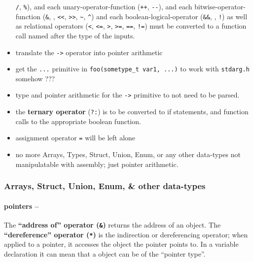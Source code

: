 \begin{itemize}
  \texttt{/}, \texttt{\%}), and each unary-operator-function
  (\texttt{++}, \texttt{-\/-}), and each bitwise-operator-function
  (\texttt{\&}, \texttt{\textbar{}}, \texttt{\textless{}\textless{}},
  \texttt{\textgreater{}\textgreater{}}, \texttt{\textasciitilde{}},
  \texttt{\^{}}) and each boolean-logical-operator (\texttt{\&\&},
  \texttt{\textbar{}\textbar{}}, \texttt{!}) as well as relational
  operators (\texttt{\textless{}}, \texttt{\textless{}=},
  \texttt{\textgreater{}}, \texttt{\textgreater{}=}, \texttt{==},
  \texttt{!=}) must be converted to a function call named after the type
  of the inputs.
\item
  translate the \texttt{-\textgreater{}} operator into pointer
  arithmetic
\item
  get the \texttt{...} primitive in
  \texttt{foo(sometype\_t\ var1,\ ...)} to work with \texttt{stdarg.h}
  somehow ???
\item
  type and pointer arithmetic for the \texttt{-\textgreater{}} primitive
  to not need to be parsed.
\item
  the \textbf{ternary operator} (\texttt{?:}) is to be converted to if
  statements, and function calls to the appropriate boolean function.
\item
  assignment operator \texttt{=} will be left alone
\item
  no more Arrays, Types, Struct, Union, Enum, or any other data-types
  not manipulatable with assembly; just pointer arithmetic.
\end{itemize}

\hypertarget{arrays-struct-union-enum-other-data-types}{%
\subsubsection{Arrays, Struct, Union, Enum, \& other
data-types}\label{arrays-struct-union-enum-other-data-types}}

\hypertarget{pointers}{%
\paragraph{pointers --}\label{pointers}}

The \textbf{``address of'' operator (\texttt{\&})} returns the address
of an object. The \textbf{``dereference'' operator (\texttt{*})} is the
indirection or dereferencing operator; when applied to a pointer, it
accesses the object the pointer points to. In a variable declaration it
can mean that a object can be of the ``pointer type''.

